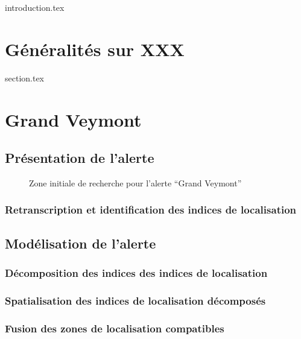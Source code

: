 
\chaptertoc{}

{introduction.tex}

\section{Généralités sur XXX}
\label{sec:9-1}
{section.tex}

\section{Grand Veymont}
\label{sec:9-1}

\subsection{Présentation de l'alerte}
\label{subsec:9-1-1}

\begin{figure}
  \centering
  
  \caption{Zone initiale de recherche pour l'alerte \enquote{Grand Veymont}}
  \label{fig:zir_grand_veyont}
\end{figure}



\subsubsection{Retranscription et identification des indices de localisation}
\label{subsec:9-1-1-1}

\subsection{Modélisation de l'alerte}
\label{subsec:9-1-2}


\subsubsection{Décomposition des indices des indices de localisation}
\label{subsec:9-1-2-2}

\subsubsection{Spatialisation des indices de localisation décomposés}
\label{subsec:9-1-2-3}

\subsubsection{Fusion des zones de localisation compatibles}
\label{subsec:9-1-2-4}

